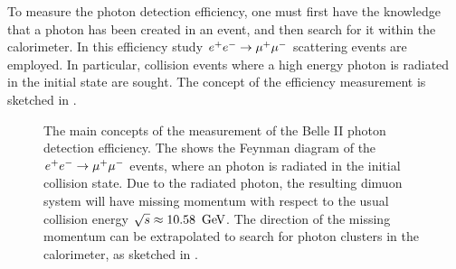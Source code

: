 To measure the photon detection efficiency, one must first have the knowledge that a photon has been created in an event, and then search for it within the calorimeter.
In this efficiency study $e^+e^-\rightarrow\mu^+\mu^-$ scattering events are employed.
In particular, collision events where a high energy photon is radiated in the initial state are sought.
The concept of the efficiency measurement is sketched in .
\begin{figure}[htbp!]
    \centering
    \caption{\label{fig:photon_efficiency_measurement} The main concepts of the measurement of the Belle II photon detection efficiency.
    The  shows the Feynman diagram of the $e^+e^-\rightarrow\mu^+\mu^-$ events, where an photon is radiated in the initial collision state.
    Due to the radiated photon, the resulting dimuon system will have missing momentum with respect to the usual collision energy $\sqrt{s}\approx10.58~\mathrm{\,Ge\kern -0.1em V}$.
    The direction of the missing momentum can be extrapolated to search for photon clusters in the calorimeter, as sketched in .
    }
\end{figure}

